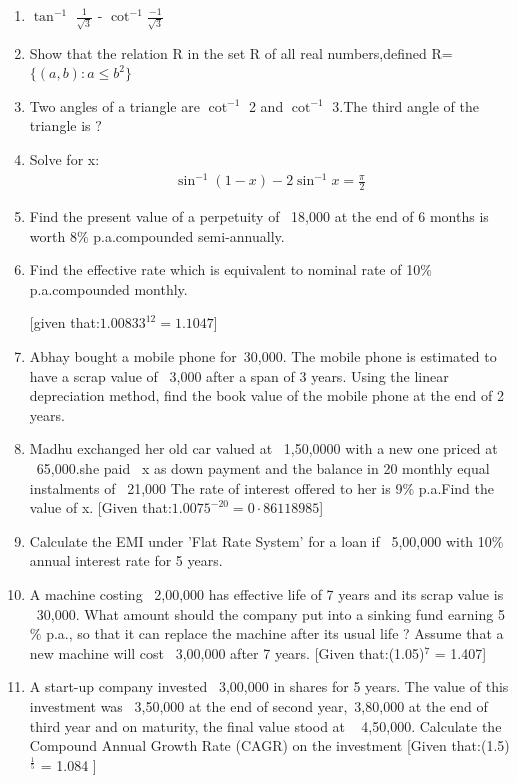 \documentclass{article}
\begin{document}
\begin{enumerate}
     \item $\tan^{-1}$ $\frac{1}{\sqrt{3}}$ - $\cot^{-1}$$\frac{-1}{\sqrt{3}}$
     \item Show that the relation R in the set R of all real numbers,defined R= $\{(a,b):a\leq b^2\}$
         \item Two angles of a triangle are $\cot^{-1}$ 2 and $\cot^{-1}$ 3.The third angle of the triangle is $?$
         \item Solve for x:
         \begin{align}
          \sin^{-1}(1-x)-2 \sin^{-1} x=\frac{\pi}{2} 
         \end{align}
\item Find the present value of a perpetuity of \rupee~18,000 at the end of 6 months is worth 8$\%$ p.a.compounded semi-annually.
\item Find the effective rate which is equivalent to nominal rate of 10$\%$ p.a.compounded monthly.

    [given that:$1.00833^{12} = 1.1047$]
    \item Abhay bought a mobile phone for\rupee~30,000. The mobile phone is estimated to have a scrap value of \rupee~3,000 after a span of 3 years. Using the linear depreciation method, find the book value of the mobile phone at the end of 2 years.    
\item Madhu exchanged her old car valued at \rupee~1,50,0000 with a new one priced at  \rupee~65,000.she paid \rupee~x as down payment and the balance in 20 monthly equal instalments of \rupee~21,000 The rate of interest offered to her is 9$\%$ p.a.Find the value of x.
    [Given that:$1.0075^{-20} = 0·86118985$] 
    \item Calculate the EMI under 'Flat Rate System' for a loan if 
\rupee~5,00,000 with 10$\%$ annual interest rate for 5 years.  
\item A machine costing \rupee~2,00,000 has effective life of 7 years and its scrap value is \rupee~30,000. What amount should the company put into a sinking fund earning 5 $\%$ p.a., so that it can replace the machine after its usual life ? Assume that a new machine will cost \rupee~3,00,000 after 7 years. 
[Given that:(1.05)$^7$ = 1.407]
\item A start-up company invested \rupee~3,00,000 in shares for 5 years. The value of this investment was \rupee~3,50,000 at the end of second year,\rupee~3,80,000 at the end of third year and on maturity, the final value stood at \rupee~ 4,50,000. Calculate the Compound Annual Growth Rate (CAGR) on the investment
[Given that:(1.5)$^\frac{1}{5}$ = 1.084 ]

     \end{enumerate}
\end{document}
